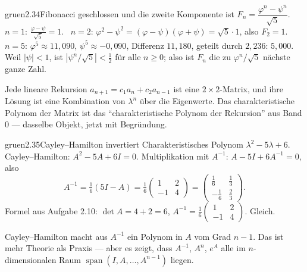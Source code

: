 \begin{loesungkarte}{gruen}{2.34}{Fibonacci geschlossen}
und die zweite Komponente ist $F_n = \dfrac{\varphi^{n} - \psi^{n}}{\sqrt5}$.
$n = 1$: $\frac{\varphi - \psi}{\sqrt5} = 1$. \checkmark\ $n = 2$: $\varphi^{2} - \psi^{2} = (\varphi - \psi)(\varphi + \psi) = \sqrt5\cdot1$, also $F_2 = 1$. \checkmark\ $n = 5$: $\varphi^{5}\approx11{,}090$, $\psi^{5}\approx-0{,}090$, Differenz $11{,}180$, geteilt durch $2{,}236$: $5{,}000$. \checkmark\ \\
Weil $|\psi| < 1$, ist $|\psi^{n}/\sqrt5| < \frac12$ für alle $n\ge0$; also ist $F_n$ die zu $\varphi^{n}/\sqrt5$ nächste ganze Zahl.
\begin{mitnehmen}\kastentext
Jede lineare Rekursion $a_{n+1} = c_1a_n + c_2a_{n-1}$ ist eine $2\times2$-Matrix, und ihre Lösung ist eine Kombination von $\lambda^{n}$ über die Eigenwerte. Das charakteristische Polynom der Matrix ist das \enquote{charakteristische Polynom der Rekursion} aus Band 0 --- dasselbe Objekt, jetzt mit Begründung.
\end{mitnehmen}
\end{loesungkarte}

\begin{loesungkarte}{gruen}{2.35}{Cayley--Hamilton invertiert}
Charakteristisches Polynom $\lambda^{2} - 5\lambda + 6$. Cayley--Hamilton: $A^{2} - 5A + 6I = 0$. Multiplikation mit $A^{-1}$: $A - 5I + 6A^{-1} = 0$, also
\[ A^{-1} = \tfrac16(5I - A) = \tfrac16\begin{pmatrix}1 & 2\\ -1 & 4\end{pmatrix} = \begin{pmatrix}\frac16 & \frac13\\ -\frac16 & \frac23\end{pmatrix}. \]
Formel aus Aufgabe 2.10: $\det A = 4 + 2 = 6$, $A^{-1} = \frac16\begin{pmatrix}1 & 2\\ -1 & 4\end{pmatrix}$. Gleich. \checkmark
{}
\begin{mitnehmen}\kastentext
Cayley--Hamilton macht aus $A^{-1}$ ein Polynom in $A$ vom Grad $n - 1$. Das ist mehr Theorie als Praxis --- aber es zeigt, dass $A^{-1}$, $A^{n}$, $e^{A}$ alle im $n$-dimensionalen Raum $\operatorname{span}(I, A, \dots, A^{n-1})$ liegen.
\end{mitnehmen}
\end{loesungkarte}


